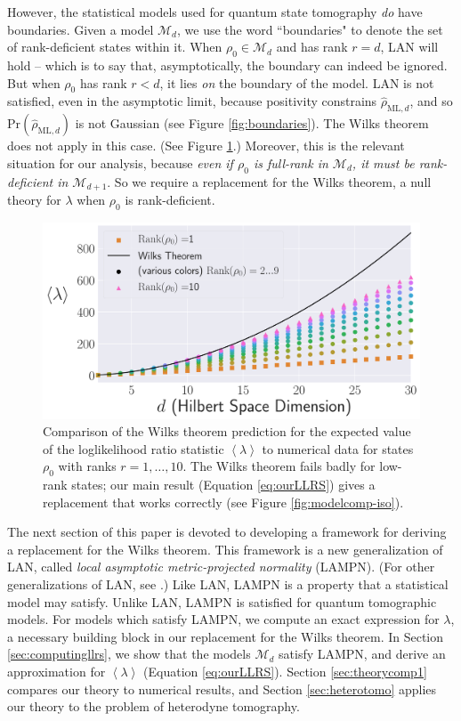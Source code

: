 \documentclass[aps,pra, twocolumn]{revtex4-1}
\newcommand{\M}{\mathcal{M}}
\newcommand{\expect}[1]{\ensuremath{\left\langle#1\right\rangle}}
\newcommand{\rhohat}{\hat{\rho}}
\newcommand{\rhoML}[1]{\rhohat_{\scriptscriptstyle{\mathrm{ML},#1}}}
\begin{document}
However, the statistical models used for quantum state tomography \emph{do} have boundaries. Given a model $\M_{d}$, we use the word ``boundaries" to denote the set of rank-deficient states within it. When $\rho_{0}\in \M_{d}$ and has rank $r = d$, LAN will hold -- which is to say that, asymptotically, the boundary can indeed be ignored. But when $\rho_{0}$ has rank $r<d$, it lies \emph{on} the boundary of the model.  LAN is not satisfied, even in the asymptotic limit, because positivity constrains $\rhoML{d}$, and so $\mathrm{Pr}(\rhoML{d})$ is not Gaussian (see Figure \ref{fig:boundaries}).  The Wilks theorem does not apply in this case.  (See Figure \ref{fig:boundaries2}.) Moreover, this is the relevant situation for our analysis, because \emph{even if $\rho_{0}$ is full-rank in $\M_{d}$, it must be rank-deficient in $\M_{d+1}$}.  So we require a replacement for the Wilks theorem, a null theory for $\lambda$ when $\rho_0$ is rank-deficient. 



\begin{figure}
\includegraphics[width=\columnwidth]{Images/Figure_2A.pdf}
 \caption{Comparison of the Wilks theorem prediction for the expected value of the loglikelihood ratio statistic $\expect{\lambda}$ to numerical data for states $\rho_{0}$ with ranks $r=1,\ldots ,10$.  The Wilks theorem fails badly for low-rank states; our main result (Equation \ref{eq:ourLLRS}) gives a replacement that works correctly (see Figure \ref{fig:modelcomp-iso}).}
\label{fig:boundaries2}
\end{figure}

The next section of this paper is devoted to developing a framework for deriving a replacement for the Wilks theorem. This framework is a new generalization of LAN, called \emph{local asymptotic metric-projected normality} (LAMPN). (For other generalizations of LAN, see \cite{Roussas2010, Jeganathan1982}.) Like LAN, LAMPN is a property that a statistical model may satisfy. Unlike LAN, LAMPN is satisfied for quantum tomographic models. For models which satisfy LAMPN, we compute an exact expression for $\lambda$, a necessary building block in our replacement for the Wilks theorem. In Section \ref{sec:computingllrs}, we show that the models $\M_{d}$ satisfy LAMPN, and derive an approximation for $\expect{\lambda}$  (Equation \eqref{eq:ourLLRS}).  Section \ref{sec:theorycomp1} compares our theory to numerical results, and Section \ref{sec:heterotomo} applies our theory to the problem of heterodyne tomography.
\end{document}
